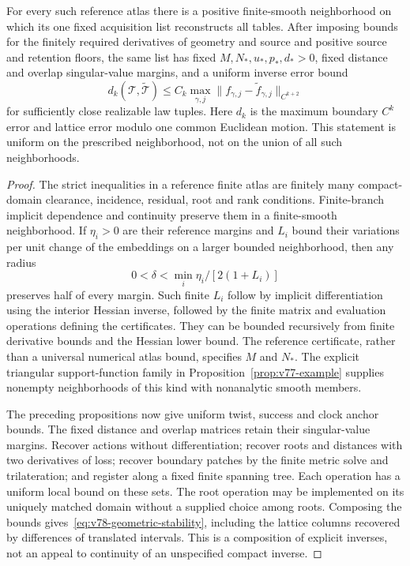 \begin{theorem}
\label{thm:v78-uniform}\label{thm:v77-stability}
For every such reference atlas there is a positive finite-smooth
neighborhood on which its one fixed acquisition list reconstructs all
tables.  After imposing bounds for the finitely required derivatives of
geometry and source and positive source and retention floors, the same
list has fixed $M,N_*,u_*,p_*,d_*>0$, fixed distance and overlap
singular-value margins, and a uniform inverse error bound
\begin{equation}\label{eq:v78-geometric-stability}
 d_k(\mathcal T,\widetilde{\mathcal T})
 \le C_k\max_{\gamma,j}
       \|f_{\gamma,j}-\widetilde f_{\gamma,j}\|_{C^{k+2}}
\end{equation}
for sufficiently close realizable law tuples.  Here $d_k$ is the
maximum boundary $C^k$ error and lattice error modulo one common
Euclidean motion.  This statement is uniform on the prescribed
neighborhood, not on the union of all such neighborhoods.
\end{theorem}
\begin{proof}
The strict inequalities in a reference finite atlas are finitely many
compact-domain clearance, incidence, residual, root and rank conditions.
Finite-branch implicit dependence and continuity preserve them in a
finite-smooth neighborhood.  If $\eta_i>0$ are their reference margins
and $L_i$ bound their variations per unit change of the embeddings on a
larger bounded neighborhood, then any radius
\[
                  0<\delta<\min_i\eta_i/[2(1+L_i)]
\]
preserves half of every margin.  Such finite $L_i$ follow by implicit
differentiation using the interior Hessian inverse, followed by the
finite matrix and evaluation operations defining the certificates.
They can be bounded recursively from finite derivative bounds and the
Hessian lower bound.  The reference certificate, rather than a universal
numerical atlas bound, specifies $M$ and $N_*$.  The explicit triangular
support-function family in Proposition~\ref{prop:v77-example} supplies
nonempty neighborhoods of this kind with nonanalytic smooth members.

The preceding propositions now give uniform twist, success and clock
anchor bounds.  The fixed distance and overlap matrices retain their
singular-value margins.  Recover actions without differentiation; recover
roots and distances with two derivatives of loss; recover boundary
patches by the finite metric solve and trilateration; and register along
a fixed finite spanning tree.  Each operation has a uniform local bound
on these sets.  The root operation may be implemented on its uniquely
matched domain without a supplied choice among roots.  Composing the
bounds gives~\eqref{eq:v78-geometric-stability}, including the lattice
columns recovered by differences of translated intervals.  This is a
composition of explicit inverses, not an appeal to continuity of an
unspecified compact inverse.
\end{proof}


